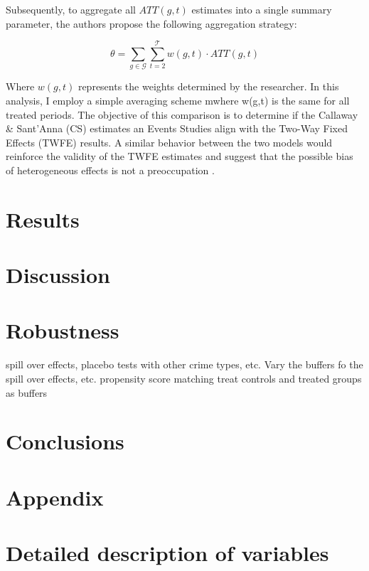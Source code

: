 \documentclass[12pt]{article}
\begin{document}
Subsequently, to aggregate all $ATT(g,t)$ estimates into a single summary parameter, the authors propose the following aggregation strategy:

\begin{equation} 
\theta = \sum_{g \in \mathcal{G}} \sum_{t=2}^{\mathcal{T}} w(g, t) \cdot ATT(g, t)
\end{equation}

Where $w(g,t)$ represents the weights determined by the researcher. 
In this analysis, I employ a simple averaging scheme mwhere w(g,t) is the same for all treated periods. 
The objective of this comparison is to determine if the Callaway \& Sant’Anna (CS) estimates an Events Studies align with the Two-Way Fixed Effects (TWFE) results. 
A similar behavior between the two models would reinforce the validity of the TWFE estimates and suggest that the possible bias of heterogeneous effects is not a preoccupation \parencite{RiosAvila_Callaway_SantAnna_2021_csdid_slides,Callaway_SantAnna_2021}.

\section{Results}
\label{sec:Results}

\section{Discussion}

\section{Robustness}
spill over effects, placebo tests with other crime types, etc.
Vary the buffers fo the spill over effects, etc.
propensity score matching
treat controls and treated groups as buffers

\section{Conclusions}


\newpage
\printbibliography

\newpage

\section{Appendix}

\appendix
{}

\section{Detailed description of variables}
\label{sec:variables_descripcion_detallada}
\end{document}
